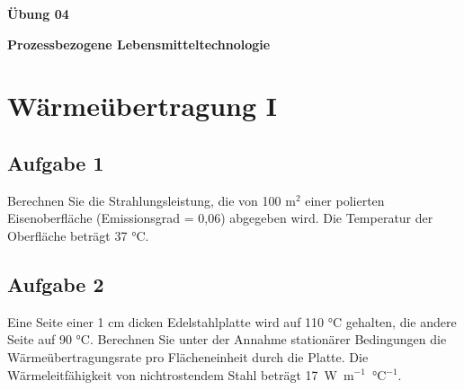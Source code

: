 \documentclass[a4paper,11pt]{article}
\newif\ifshowme
\begin{document}


\bckgrnd


\begin{center}
\LARGE
\color{white}
\textbf{Übung 04} \par \vspace*{2mm}
\large \color{miugray} \textbf{Prozessbezogene Lebensmitteltechnologie}
\end{center}
\par 
\vspace*{6mm}


\color{miudiutex}
\section*{Wärmeübertragung I}
\subsection*{Aufgabe 1}
Berechnen Sie die Strahlungsleistung, die von 100 m$^2$ einer polierten Eisenoberfläche
(Emissionsgrad = 0,06) abgegeben wird. Die Temperatur der Oberfläche beträgt 37 °C.


\ifshowme
\antwort{
\begin{align*}
P &= \varepsilon \cdot \sigma \cdot A \cdot T^4 \\ 
P &= 0,06 \cdot  100~\text{m}^2 \cdot 5,67 \cdot 10^{-8} ~\text{W} \cdot \text{m}^{-2}\text{K}^{-4}\cdot 310,15~\text{K}^4 \\
P &= 3.147,9~\text{W}
\end{align*}
}
\else
\fi

\subsection*{Aufgabe 2}
Eine Seite einer 1 cm dicken Edelstahlplatte wird auf 110 °C gehalten, die andere Seite
auf 90 °C. Berechnen Sie unter der Annahme stationärer Bedingungen die
Wärmeübertragungsrate pro Flächeneinheit durch die Platte. Die Wärmeleitfähigkeit von
nichtrostendem Stahl beträgt \mbox{17 W m$^{-1}$ °C$^{-1}$}.

\ifshowme
\antwort{
\begin{align*}
\dot{Q} &= - A \cdot \frac{\lambda}{d} \cdot (T_2 - T_1) \\
- \frac{\dot{Q}}{A} &= \cdot \frac{\lambda}{d} \cdot (T_2 - T_1) \\
- \frac{\dot{Q}}{A} &= \cdot \frac{17 \text{W} / \text{m°C}}{0,01m} \cdot 20\text{°C}\\
	&= 34.000 ~\text{W / m$^2$}
\end{align*}

}
\pagebreak
\else
\fi
\end{document}
